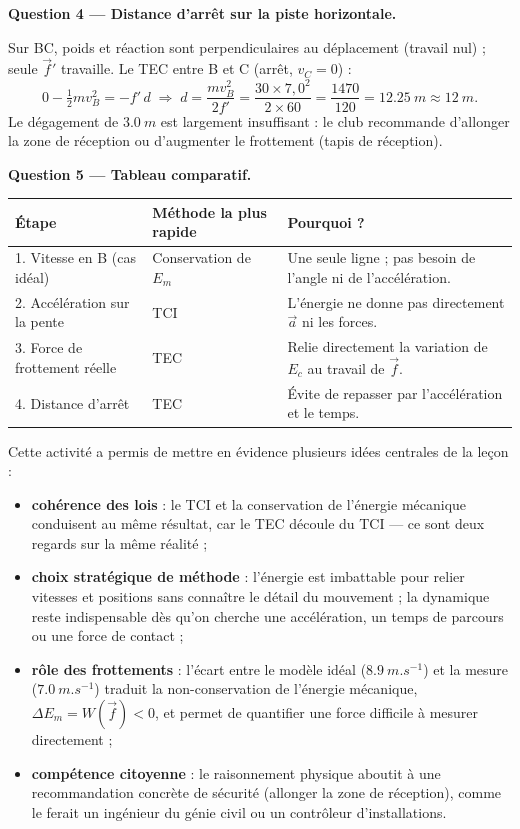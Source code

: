 \documentclass[11pt]{article}
\newcounter{popsec}
\newcounter{popsub}
\newcommand{\courssub}[1]{%
  \stepcounter{popsub}%
  \par\vspace{9pt}\noindent{\popxbold\fontsize{11.5}{13}\selectfont\color{popink}{\color{poporange}\thepopsec.\thepopsub}\hspace{6pt}#1}\par\nopagebreak\vspace{4pt}
}
\begin{document}
\begin{exoresolu}
\textbf{Question 4 — Distance d'arrêt sur la piste horizontale.}

Sur BC, poids et réaction sont perpendiculaires au déplacement (travail nul) ; seule $\vec{f}'$ travaille. Le TEC entre B et C (arrêt, $v_C = 0$) :
\[
0 - \tfrac{1}{2}mv_B^2 = -f'\,d
\;\Longrightarrow\; d = \dfrac{mv_B^2}{2f'} = \dfrac{30\times 7{,}0^2}{2\times 60} = \dfrac{1470}{120} = \SI{12,25}{m} \approx \SI{12}{m}.
\]
Le dégagement de $\SI{3,0}{m}$ est largement insuffisant : le club recommande d'allonger la zone de réception ou d'augmenter le frottement (tapis de réception).

\textbf{Question 5 — Tableau comparatif.}

\begin{center}
\begin{tabularx}{\linewidth}{|l|X|X|}
\hline
\rowcolor{popblueL} \textbf{Étape} & \textbf{Méthode la plus rapide} & \textbf{Pourquoi ?} \\
\hline
1. Vitesse en B (cas idéal) & Conservation de $E_m$ & Une seule ligne ; pas besoin de l'angle ni de l'accélération. \\
\hline
2. Accélération sur la pente & TCI & L'énergie ne donne pas directement $\vec{a}$ ni les forces. \\
\hline
3. Force de frottement réelle & TEC & Relie directement la variation de $E_c$ au travail de $\vec{f}$. \\
\hline
4. Distance d'arrêt & TEC & Évite de repasser par l'accélération et le temps. \\
\hline
\end{tabularx}
\end{center}
\end{exoresolu}

\courssub{Bilan de l'activité}

Cette activité a permis de mettre en évidence plusieurs idées centrales de la leçon :
\begin{itemize}
\item \textbf{cohérence des lois} : le TCI et la conservation de l'énergie mécanique conduisent au même résultat, car le TEC découle du TCI — ce sont deux regards sur la même réalité ;
\item \textbf{choix stratégique de méthode} : l'énergie est imbattable pour relier vitesses et positions sans connaître le détail du mouvement ; la dynamique reste indispensable dès qu'on cherche une accélération, un temps de parcours ou une force de contact ;
\item \textbf{rôle des frottements} : l'écart entre le modèle idéal ($\SI{8,9}{m.s^{-1}}$) et la mesure ($\SI{7,0}{m.s^{-1}}$) traduit la non-conservation de l'énergie mécanique, $\Delta E_m = W(\vec{f}) < 0$, et permet de quantifier une force difficile à mesurer directement ;
\item \textbf{compétence citoyenne} : le raisonnement physique aboutit à une recommandation concrète de sécurité (allonger la zone de réception), comme le ferait un ingénieur du génie civil ou un contrôleur d'installations.
\end{itemize}
\end{document}
